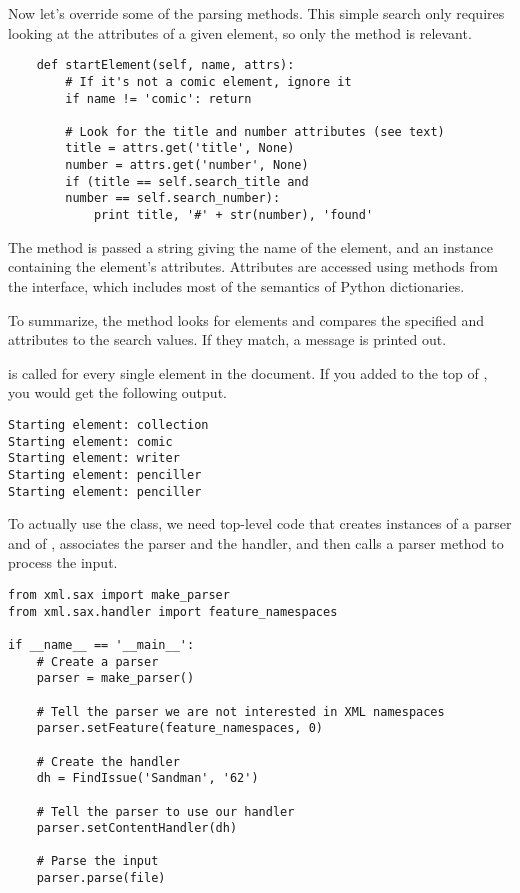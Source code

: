 \documentclass{howto}
\newcommand{\element}[1]{\code{#1}}
\newcommand{\attribute}[1]{\code{#1}}
\begin{document}
Now let's override some of the parsing methods.
This simple search only requires looking at the attributes of a given
element, so only the  method is relevant.

\begin{verbatim}
    def startElement(self, name, attrs):
        # If it's not a comic element, ignore it
        if name != 'comic': return

        # Look for the title and number attributes (see text)
        title = attrs.get('title', None)
        number = attrs.get('number', None)
        if (title == self.search_title and 
	    number == self.search_number):
            print title, '#' + str(number), 'found'
\end{verbatim}

The  method is passed a string giving the name
of the element, and an instance containing the element's attributes.
Attributes are accessed using 
methods from the  interface, which
includes most of the semantics of Python dictionaries.  

To summarize, the  method looks for
\element{comic} elements and compares the specified \attribute{title}
and \attribute{number} attributes to the search values.  If they
match, a message is printed out.

 is called for every single element in the
document.  If you added  to the
top of  , you would get the following output.

\begin{verbatim}
Starting element: collection
Starting element: comic
Starting element: writer
Starting element: penciller
Starting element: penciller
\end{verbatim}

To actually use the class, we need top-level code that creates
instances of a parser and of , associates the parser
and the handler, and then calls a parser method to process the input.

\begin{verbatim}
from xml.sax import make_parser
from xml.sax.handler import feature_namespaces

if __name__ == '__main__':
    # Create a parser
    parser = make_parser()

    # Tell the parser we are not interested in XML namespaces
    parser.setFeature(feature_namespaces, 0)

    # Create the handler
    dh = FindIssue('Sandman', '62')

    # Tell the parser to use our handler
    parser.setContentHandler(dh)

    # Parse the input
    parser.parse(file)
\end{verbatim}
\end{document}
